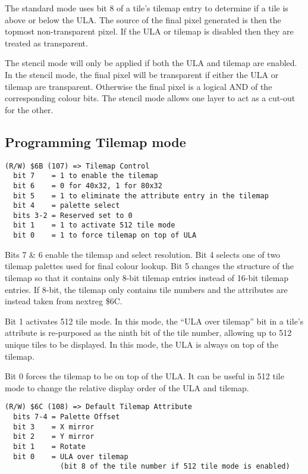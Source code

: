 The standard mode uses bit 8 of a tile's tilemap entry to determine if
a tile is above or below the ULA. The source of the final pixel
generated is then the topmost non-transparent pixel. If the ULA or
tilemap is disabled then they are treated as transparent.

The stencil mode will only be applied if both the ULA and tilemap are
enabled. In the stencil mode, the final pixel will be transparent if
either the ULA or tilemap are transparent. Otherwise the final pixel
is a logical AND of the corresponding colour bits. The stencil mode
allows one layer to act as a cut-out for the other.

\subsection{Programming Tilemap mode}

\begin{verbatim}
(R/W) $6B (107) => Tilemap Control
  bit 7    = 1 to enable the tilemap
  bit 6    = 0 for 40x32, 1 for 80x32
  bit 5    = 1 to eliminate the attribute entry in the tilemap
  bit 4    = palette select
  bits 3-2 = Reserved set to 0
  bit 1    = 1 to activate 512 tile mode
  bit 0    = 1 to force tilemap on top of ULA
\end{verbatim}

Bits 7 \& 6 enable the tilemap and select resolution. Bit 4 selects one
of two tilemap palettes used for final colour lookup. Bit 5 changes
the structure of the tilemap so that it contains only 8-bit tilemap
entries instead of 16-bit tilemap entries. If 8-bit, the tilemap only
contains tile numbers and the attributes are instead taken from
nextreg \$6C.

Bit 1 activates 512 tile mode. In this mode, the “ULA over tilemap”
bit in a tile’s attribute is re-purposed as the ninth bit of the tile
number, allowing up to 512 unique tiles to be displayed. In this mode,
the ULA is always on top of the tilemap.

Bit 0 forces the tilemap to be on top of the ULA. It can be useful in
512 tile mode to change the relative display order of the ULA and
tilemap.

\begin{verbatim}
(R/W) $6C (108) => Default Tilemap Attribute
  bits 7-4 = Palette Offset
  bit 3    = X mirror
  bit 2    = Y mirror
  bit 1    = Rotate
  bit 0    = ULA over tilemap
             (bit 8 of the tile number if 512 tile mode is enabled)
\end{verbatim}

